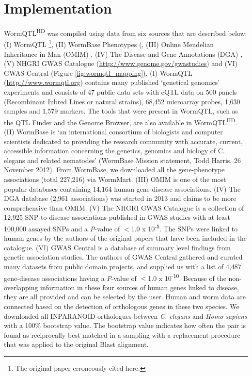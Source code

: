 \section{Implementation}
WormQTL\textsuperscript{HD} was compiled using data from six sources that are described below:
(I) WormQTL \cite{Snoek_2012}\footnote{The original paper erroneously cited \cite{Rodriguez_2013,Volkers_2013} here.}, (II) WormBase Phenotypes (\cite{Yook_2011}, (III) Online Mendelian Inheritance in Man (OMIM) \cite{Hamosh_2000}, (IV) The Disease and Gene Annotations (DGA) \cite{Peng_2012}, (V) NHGRI GWAS Catalogue \cite{Hindorff_2009} (\url{http://www.genome.gov/gwastudies}) and (VI) GWAS Central \cite{Thorisson_2009,Brookes_2000} (Figure \ref{fig:wormqtl_mapping}).
(I) WormQTL (\url{http://www.wormqtl.org}) contains many published ‘genetical genomics’ experiments and consists of 47 public data sets with eQTL data on 500 panels (Recombinant Inbred Lines or natural strains), 68,452 microarray probes, 1,630 samples and 1,579 markers.
The tools that were present in WormQTL, such as the QTL Finder and the Genome Browser, are also available in WormQTL\textsuperscript{HD}.
(II) WormBase is ‘an international consortium of biologists and computer scientists dedicated to providing the research community with accurate, current, accessible information concerning the genetics, genomics and biology of C. elegans and related nematodes’ (WormBase Mission statement, Todd Harris, 26 November 2012). From WormBase, we downloaded all the gene-phenotype associations (total 227,216) via WormMart.
(III) OMIM is one of the most popular databases containing 14,164 human gene-disease associations.
(IV) The DGA database (2,961 associations) was started in 2013 and claims to be more comprehensive than OMIM.
(V) The NHGRI GWAS Catalogue is a collection of 12,925 SNP-to-disease associations published in GWAS studies with at least 100,000 assayed SNPs and a \textsl{P}-value of $<$1.0 x 10\textsuperscript{-5}. The SNPs were linked to human genes by the authors of the original papers that have been included in the catalogue.
(VI) GWAS Central \cite{Thorisson_2009,Brookes_2000,Fredman_2002} is a database of summary level findings from genetic association studies.
The authors of GWAS Central gathered and curated many datasets from public domain projects, and supplied us with a list of 4,487 gene-disease associations having a \textsl{P}-value of $<$1.0 x 10\textsuperscript{-10}.
Because of the non-overlapping information in these four sources of human genes linked to disease, they are all provided and can be selected by the user.
Human and worm data are connected based on the detection of orthologous genes in these two species. We downloaded all INPARANOID orthologues between \textsl{C. elegans} and \textsl{Homo sapiens} with a 100\% bootstrap value.
The bootstrap value indicates how often the pair is found as reciprocally best matched in a sampling with a replacement procedure that was applied to the original Blast alignment.

